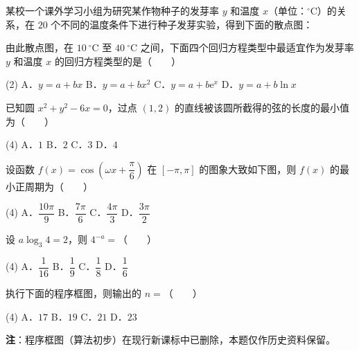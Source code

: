 某校一个课外学习小组为研究某作物种子的发芽率 $y$ 和温度 $x$（单位：$^\circ\mathrm C$）的关系，在 $20$ 个不同的温度条件下进行种子发芽实验，得到下面的散点图：

\begin{center}\end{center}

由此散点图，在 $10\ ^\circ\mathrm C$ 至 $40\ ^\circ\mathrm C$ 之间，下面四个回归方程类型中最适宜作为发芽率 $y$ 和温度 $x$ 的回归方程类型的是（　　）

\begin{gkopts}(2)
\task A．$y=a+bx$
\task B．$y=a+bx^{2}$
\task C．$y=a+b\mathrm e^{x}$
\task D．$y=a+b\ln x$
\end{gkopts}

已知圆 $x^{2}+y^{2}-6x=0$，过点 $(1,2)$ 的直线被该圆所截得的弦的长度的最小值为（　　）

\begin{gkopts}(4)
\task A．$1$
\task B．$2$
\task C．$3$
\task D．$4$
\end{gkopts}

设函数 $f(x)=\cos\left(\omega x+\dfrac\pi6\right)$ 在 $[-\pi,\pi]$ 的图象大致如下图，则 $f(x)$ 的最小正周期为（　　）

\begin{center}\end{center}

\begin{gkopts}(4)
\task A．$\dfrac{10\pi}9$
\task B．$\dfrac{7\pi}6$
\task C．$\dfrac{4\pi}3$
\task D．$\dfrac{3\pi}2$
\end{gkopts}

设 $a\log_3 4=2$，则 $4^{-a}=$（　　）

\begin{gkopts}(4)
\task A．$\dfrac1{16}$
\task B．$\dfrac19$
\task C．$\dfrac18$
\task D．$\dfrac16$
\end{gkopts}

执行下面的程序框图，则输出的 $n=$（　　）

\begin{center}\end{center}

\begin{gkopts}(4)
\task A．$17$
\task B．$19$
\task C．$21$
\task D．$23$
\end{gkopts}

\begin{gktip}
\textbf{注}：程序框图（算法初步）在现行新课标中已删除，本题仅作历史资料保留。
\end{gktip}

